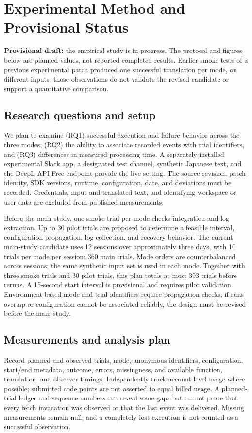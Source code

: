 \documentclass[10pt,twocolumn]{article}
\begin{document}
\section{Experimental Method and Provisional Status}\label{sec:experiment}
\textbf{Provisional draft:} the empirical study is in progress. The protocol and figures below are planned values, not reported completed results. Earlier smoke tests of a previous experimental patch produced one successful translation per mode, on different inputs; those observations do not validate the revised candidate or support a quantitative comparison.

\subsection{Research questions and setup}
We plan to examine (RQ1) successful execution and failure behavior across the three modes, (RQ2) the ability to associate recorded events with trial identifiers, and (RQ3) differences in measured processing time. A separately installed experimental Slack app, a designated test channel, synthetic Japanese text, and the DeepL API Free endpoint provide the live setting. The source revision, patch identity, SDK versions, runtime, configuration, date, and deviations must be recorded. Credentials, input and translated text, and identifying workspace or user data are excluded from published measurements.

Before the main study, one smoke trial per mode checks integration and log extraction. Up to 30 pilot trials are proposed to determine a feasible interval, configuration propagation, log collection, and recovery behavior. The current main-study candidate uses 12 sessions over approximately three days, with 10 trials per mode per session: 360 main trials. Mode orders are counterbalanced across sessions; the same synthetic input set is used in each mode. Together with three smoke trials and 30 pilot trials, this plan totals at most 393 trials before reruns. A 15-second start interval is provisional and requires pilot validation. Environment-based mode and trial identifiers require propagation checks; if runs overlap or configuration cannot be associated reliably, the design must be revised before the main study.

\subsection{Measurements and analysis plan}
Record planned and observed trials, mode, anonymous identifiers, configuration, start/end metadata, outcome, errors, missingness, and available function, translation, and observer timings. Independently track account-level usage where possible; submitted code points are not asserted to equal billed usage. A planned-trial ledger and sequence numbers can reveal some gaps but cannot prove that every fetch invocation was observed or that the last event was delivered. Missing measurements remain null, and a completely lost execution is not counted as a successful observation.
\end{document}
